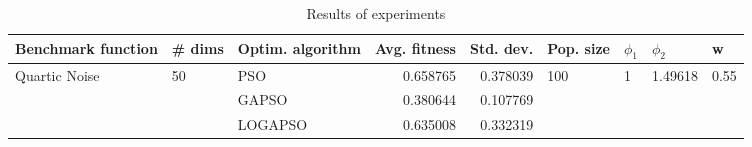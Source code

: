 \begin{table}
\centering
\caption{Results of experiments}
\begin{tabular}{lllrrllll}
\toprule
            Benchmark function &             \# dims & Optim. algorithm &  Avg. fitness &  Std. dev. &            Pop. size &         $\phi_{1}$ &               $\phi_{2}$ &                     w \\
\midrule
\multirow{3}{*}{Quartic Noise} & \multirow{3}{*}{50} &              PSO &      0.658765 &   0.378039 & \multirow{3}{*}{100} & \multirow{3}{*}{1} & \multirow{3}{*}{1.49618} & \multirow{3}{*}{0.55} \\
                               &                     &            GAPSO &      0.380644 &   0.107769 &                      &                    &                          &                       \\
                               &                     &          LOGAPSO &      0.635008 &   0.332319 &                      &                    &                          &                       \\
\bottomrule
\end{tabular}
\end{table}
